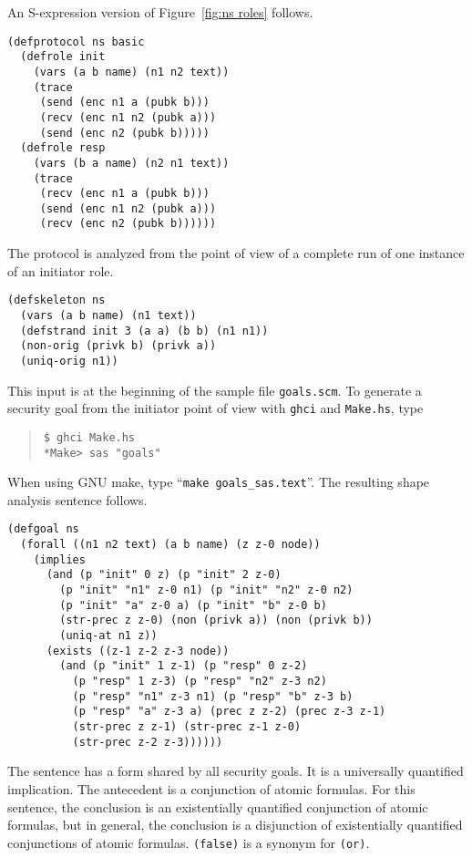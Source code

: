 \documentclass[12pt]{article}
\newcommand{\sym}[1]{\textup{\texttt{#1}}}
\begin{document}
An S-expression version of Figure~\ref{fig:ns roles} follows.

\begin{verbatim}
(defprotocol ns basic
  (defrole init
    (vars (a b name) (n1 n2 text))
    (trace
     (send (enc n1 a (pubk b)))
     (recv (enc n1 n2 (pubk a)))
     (send (enc n2 (pubk b)))))
  (defrole resp
    (vars (b a name) (n2 n1 text))
    (trace
     (recv (enc n1 a (pubk b)))
     (send (enc n1 n2 (pubk a)))
     (recv (enc n2 (pubk b))))))
\end{verbatim}

The protocol is analyzed from the point of view of a complete run of
one instance of an initiator role.

\begin{verbatim}
(defskeleton ns
  (vars (a b name) (n1 text))
  (defstrand init 3 (a a) (b b) (n1 n1))
  (non-orig (privk b) (privk a))
  (uniq-orig n1))
\end{verbatim}

This {\cpsa} input is at the beginning of the sample file
\texttt{goals.scm}.  To generate a security goal from the initiator
point of view with \texttt{ghci} and \texttt{Make.hs}, type
\begin{quote}
\begin{verbatim}
$ ghci Make.hs
*Make> sas "goals"
\end{verbatim}
\end{quote}
When using GNU make, type ``\texttt{make goals\_sas.text}''.  The
resulting shape analysis sentence follows.

\begin{verbatim}
(defgoal ns
  (forall ((n1 n2 text) (a b name) (z z-0 node))
    (implies
      (and (p "init" 0 z) (p "init" 2 z-0)
        (p "init" "n1" z-0 n1) (p "init" "n2" z-0 n2)
        (p "init" "a" z-0 a) (p "init" "b" z-0 b)
        (str-prec z z-0) (non (privk a)) (non (privk b))
        (uniq-at n1 z))
      (exists ((z-1 z-2 z-3 node))
        (and (p "init" 1 z-1) (p "resp" 0 z-2)
          (p "resp" 1 z-3) (p "resp" "n2" z-3 n2)
          (p "resp" "n1" z-3 n1) (p "resp" "b" z-3 b)
          (p "resp" "a" z-3 a) (prec z z-2) (prec z-3 z-1)
          (str-prec z z-1) (str-prec z-1 z-0)
          (str-prec z-2 z-3))))))
\end{verbatim}

The sentence has a form shared by all security goals.  It is a
universally quantified implication.  The antecedent is a conjunction
of atomic formulas.  For this sentence, the conclusion is an
existentially quantified conjunction of atomic formulas, but in
general, the conclusion is a disjunction of existentially quantified
conjunctions of atomic formulas.  \sym{(false)} is a synonym for
\sym{(or)}.
\end{document}
